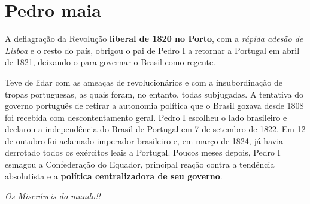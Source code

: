 \documentclass[pdftex,12pt,a4paper]{report}
\begin{document}
\author{pedro Maia}


\maketitle
\tableofcontents


\section{Pedro maia}


A deflagração da Revolução \textbf{liberal de 1820 no Porto}, com a \textit{rápida adesão de Lisboa} e o resto do país, obrigou o pai de Pedro I a retornar a Portugal em abril de 1821, deixando-o para governar o Brasil como regente.

Teve de lidar com as ameaças de revolucionários e com a insubordinação de tropas portuguesas, as quais foram, no entanto, todas subjugadas. A tentativa do governo português de retirar a autonomia política que o Brasil gozava desde 1808 foi recebida com descontentamento geral. Pedro I escolheu o lado brasileiro e declarou a independência do Brasil de Portugal em 7 de setembro de 1822. Em 12 de outubro foi aclamado imperador brasileiro e, em março de 1824, já havia derrotado todos os exércitos leais a Portugal. Poucos meses depois, Pedro I esmagou a Confederação do Equador, principal reação contra a tendência absolutista e a \textbf{política centralizadora de seu governo}.

\textit{Os Miseráveis do mundo!!}
\end{document}
